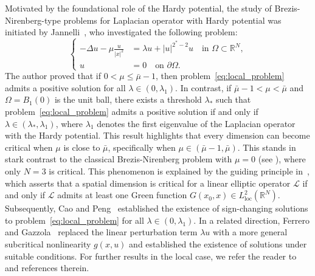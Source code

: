 \documentclass[11pt]{article}
\begin{document}
Motivated by the foundational role of the Hardy potential, the study of Brezis-Nirenberg-type problems for Laplacian operator with Hardy potential was initiated by Jannelli~\cite{jannelli_hardy_starting}, who investigated the following problem:
\begin{equation}\label{eq:local_problem} 
\left\{
\begin{aligned}
    -\Delta u  - \mu \frac{u}{|x|^2} &= \lambda  u + |u|^{2^*-2} u \quad \text{in } \Omega \subset \mathbb{R}^N, \\
    u &= 0 \quad \text{on } \partial\Omega.
\end{aligned}
\right.
\end{equation}
The author proved that if \( 0 < \mu \leq \bar{\mu} - 1 \), then problem~\eqref{eq:local_problem} admits a positive solution for all \( \lambda \in (0, \lambda_1) \). In contrast, if \( \bar{\mu} - 1 < \mu < \bar{\mu} \) and \( \Omega = B_1(0) \) is the unit ball, there exists a threshold \( \lambda_* \) such that problem~\eqref{eq:local_problem} admits a positive solution if and only if \( \lambda \in (\lambda_*, \lambda_1) \), where \( \lambda_1 \) denotes the first eigenvalue of the Laplacian operator with the Hardy potential. This result highlights that every dimension can become critical when \( \mu \) is close to \( \bar{\mu} \), specifically when \( \mu \in (\bar{\mu} - 1, \bar{\mu}) \). This stands in stark contrast to the classical Brezis-Nirenberg problem with \( \mu = 0 \) (see \cite{brezis_1983}), where only \( N = 3 \) is critical. This phenomenon is explained by the guiding principle in~\cite{jannelli_hardy_starting}, which asserts that a spatial dimension is critical for a linear elliptic operator \( \mathcal{L} \) if and only if \( \mathcal{L} \) admits at least one Green function \( G(x_0, x) \in L^2_{\text{loc}}(\mathbb{R}^N) \). Subsequently, Cao and Peng~\cite{cao_peng2003signchanging} established the existence of sign-changing solutions to problem~\eqref{eq:local_problem} for all \( \lambda \in (0, \lambda_1) \). 
In a related direction, Ferrero and Gazzola~\cite{ferrero2001existence} replaced the linear perturbation term \( \lambda u \) with a more general subcritical nonlinearity \( g(x,u) \) and established the existence of solutions under suitable conditions. For further results in the local case, we refer the reader to~\cite{pigong_local_p_hardy} and references therein. \\
\end{document}
